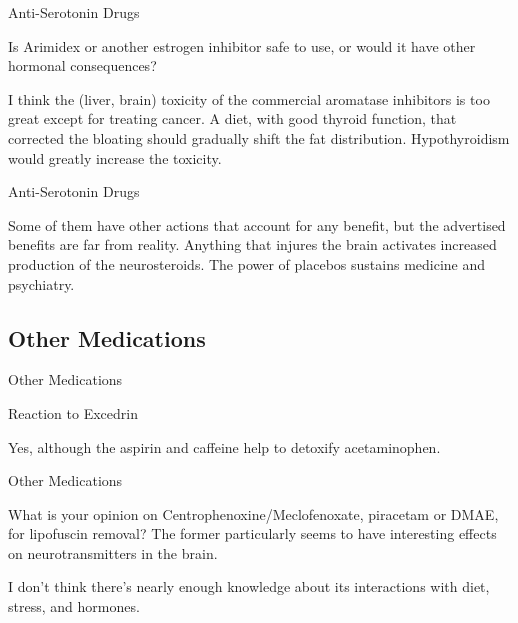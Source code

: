 \documentclass[11pt,oneside,openany,extrafontsizes]{memoir}
\begin{document}
\begin{qaexchange}{Anti-Serotonin Drugs}

    \begin{question}
         Is Arimidex or another estrogen inhibitor safe to use, or would it have other hormonal consequences?
    \end{question}

    \begin{answer}
      I think the (liver, brain) toxicity of the commercial aromatase inhibitors is too great except for treating cancer. A diet, with good thyroid function, that corrected the bloating should gradually shift the fat distribution. Hypothyroidism would greatly increase the toxicity.
    \end{answer}
\end{qaexchange}

\begin{standalonequote}{Anti-Serotonin Drugs}

    \begin{answer}
      Some of them have other actions that account for any benefit, but the advertised benefits are far from reality. Anything that injures the brain activates increased production of the neurosteroids. The power of placebos sustains medicine and psychiatry.
    \end{answer}
\end{standalonequote}

\subsection{Other Medications}

\begin{standalonequote}{Other Medications}
    \begin{note}
        Reaction to Excedrin
    \end{note}

    \begin{answer}
        Yes, although the aspirin and caffeine help to detoxify acetaminophen.
    \end{answer}
\end{standalonequote}

\begin{qaexchange}{Other Medications}

    \begin{question}
        What is your opinion on Centrophenoxine/Meclofenoxate, piracetam or DMAE, for lipofuscin removal? The former particularly seems to have interesting effects on neurotransmitters in the brain.
    \end{question}

    \begin{answer}
        I don't think there's nearly enough knowledge about its interactions with diet, stress, and hormones.
    \end{answer}
\end{qaexchange}
\end{document}
